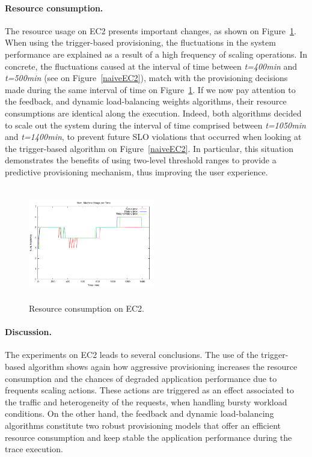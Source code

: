 \paragraph{Resource consumption.}

The resource usage on EC2 presents important changes, as shown on Figure~\ref{resEC2}. When using the trigger-based provisioning, the fluctuations in the system performance are explained as a result of a high frequency of scaling operations. In concrete, the fluctuations caused at the interval of time between \emph{t=400min} and \emph{t=500min} (see on Figure~\ref{naiveEC2}), match with the provisioning decisions made during the same interval of time on Figure~\ref{resEC2}. If we now pay attention to the feedback, and dynamic load-balancing weights algorithms, their resource consumptions are identical along the execution. Indeed, both algorithms decided to scale out the system during the interval of time comprised between \emph{t=1050min} and \emph{t=1400min}, to prevent future SLO violations that occurred when looking at the trigger-based algorithm on Figure~\ref{naiveEC2}. In particular, this situation demonstrates the benefits of using two-level threshold ranges to provide a predictive provisioning mechanism, thus improving the user experience.


\begin{figure}
\begin{center}
\includegraphics[width=0.49\textwidth, height=5cm]{./images/heterogeneous/numMachinesCompEC2}
\end{center}
\vspace{-5mm}
\caption{Resource consumption on EC2.}
\label{resEC2}
\end{figure}


\paragraph{Discussion.}
The experiments on EC2 leads to several conclusions. The use of the trigger-based algorithm shows again how aggressive provisioning increases the resource consumption and the chances of degraded application performance due to frequents scaling actions. These actions are triggered as an effect associated to the traffic and heterogeneity of the requests, when handling bursty workload conditions. On the other hand, the feedback and dynamic load-balancing algorithms constitute two robust provisioning models that offer an efficient resource consumption and keep stable the application performance during the trace execution. 

